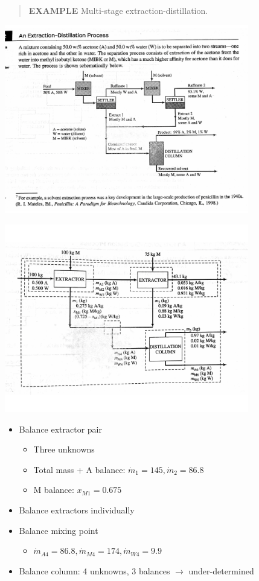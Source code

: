 \documentclass[11pt]{article}
\begin{document}
\begin{quote}
\textbf{EXAMPLE} Multi-stage extraction-distillation.
\end{quote}

\includegraphics[width=0.8\textwidth]{./figs/Example442.png}

\includegraphics[width=0.8\textwidth]{./figs/Soln442.png}

\begin{itemize}
\item Balance extractor pair
\begin{itemize}
\item Three unknowns
\item Total mass + A balance: \(\dot{m}_1 = 145, \dot{m}_{2} = 86.8\)
\item M balance: \(x_{M1} = 0.675 \)
\end{itemize}
\item Balance extractors individually
\item Balance mixing point
\begin{itemize}
\item \( \dot{m}_{A4} = 86.8, \dot{m}_{M4}= 174, \dot{m}_{W4}= 9.9\)
\end{itemize}
\item Balance column: 4 unknowns, 3 balances $\to$ under-determined
\end{itemize}
\end{document}
